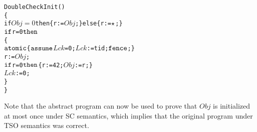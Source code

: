 \begin{alltt}DoubleCheckInit() 
\{
 if \(Obj=0\) then \{ r:=\(Obj\);\} else \{ r:=\(\alihavocval\); \}
 \(\aliif\) r=0 \(\alithen\) 
 \{
  \(\aliatomic\) \{ \(\aliassume\) {\(Lck\)=0}; \(Lck\):=tid; \(\alifence\); \}
  r:=\(Obj\);
  \(\aliif\) r=0 \(\alithen\) \{ r:=42; \(Obj\):=r; \}
  \(Lck\):=0;
 \}
\}\end{alltt}

Note that the abstract program can now be used to prove that $Obj$ is initialized at most once under SC semantics, which implies that the original program under TSO semantics was correct.

